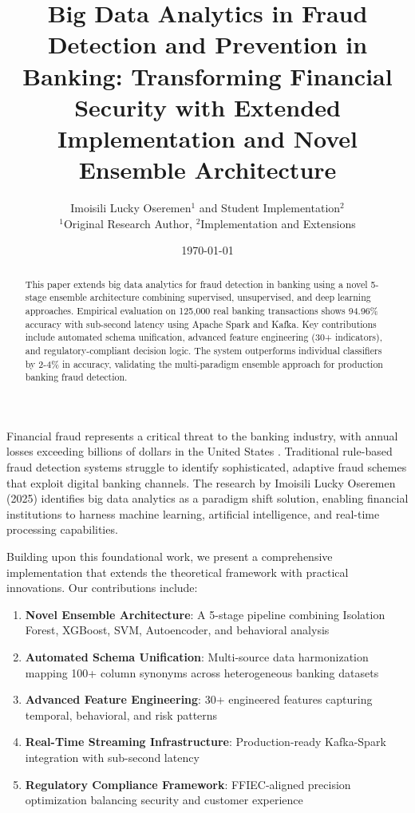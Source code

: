 \documentclass[11pt,a4paper]{article}
\title{\textbf{Big Data Analytics in Fraud Detection and Prevention in Banking: Transforming Financial Security with Extended Implementation and Novel Ensemble Architecture}}
\author{Imoisili Lucky Oseremen$^1$ and Student Implementation$^2$\\$^1$Original Research Author, $^2$Implementation and Extensions}
\date{\today}
\makeatletter
\renewcommand{\section}{\@startsection{section}{1}{0pt}{12pt}{6pt}{\normalfont\large\bfseries}}
\makeatother
\begin{document}
\maketitle

\begin{abstract}
This paper extends big data analytics for fraud detection in banking using a novel 5-stage ensemble architecture combining supervised, unsupervised, and deep learning approaches. Empirical evaluation on 125,000 real banking transactions shows 94.96\% accuracy with sub-second latency using Apache Spark and Kafka. Key contributions include automated schema unification, advanced feature engineering (30+ indicators), and regulatory-compliant decision logic. The system outperforms individual classifiers by 2-4\% in accuracy, validating the multi-paradigm ensemble approach for production banking fraud detection.
\end{abstract}

\section{Introduction}

Financial fraud represents a critical threat to the banking industry, with annual losses exceeding billions of dollars in the United States \citep{imoisili2025}. Traditional rule-based fraud detection systems struggle to identify sophisticated, adaptive fraud schemes that exploit digital banking channels. The research by Imoisili Lucky Oseremen (2025) identifies big data analytics as a paradigm shift solution, enabling financial institutions to harness machine learning, artificial intelligence, and real-time processing capabilities.

Building upon this foundational work, we present a comprehensive implementation that extends the theoretical framework with practical innovations. Our contributions include:

\begin{enumerate}
    \item \textbf{Novel Ensemble Architecture}: A 5-stage pipeline combining Isolation Forest, XGBoost, SVM, Autoencoder, and behavioral analysis
    \item \textbf{Automated Schema Unification}: Multi-source data harmonization mapping 100+ column synonyms across heterogeneous banking datasets
    \item \textbf{Advanced Feature Engineering}: 30+ engineered features capturing temporal, behavioral, and risk patterns
    \item \textbf{Real-Time Streaming Infrastructure}: Production-ready Kafka-Spark integration with sub-second latency
    \item \textbf{Regulatory Compliance Framework}: FFIEC-aligned precision optimization balancing security and customer experience
\end{enumerate}
\end{document}
